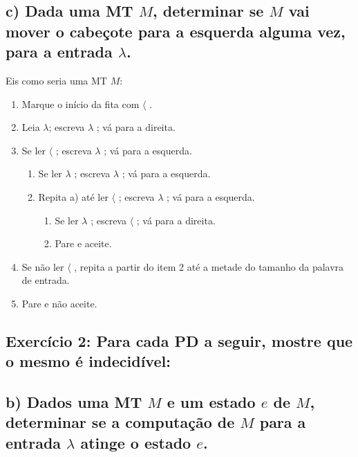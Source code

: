 \subsection*{c) Dada uma MT $M$, determinar se $M$ vai mover o cabeçote para a esquerda alguma vez, para a entrada $\lambda$.}

Eis como seria uma MT $M$:

\begin{enumerate}
    \item Marque o início da fita com $\langle$  .
    \item Leia $\lambda$; escreva $\lambda$ ; vá para a direita.
    \item Se ler $\langle$  ; escreva $\lambda$  ; vá para a esquerda.
        \begin{enumerate}
            \item Se ler $\lambda$  ; escreva $\lambda$  ; vá para a esquerda.
            \item Repita a) até ler $\langle$  ; escreva $\lambda$  ; vá para a esquerda.
            \begin{enumerate}
                \item Se ler $\lambda$  ; escreva $\langle$  ; vá para a direita.
                \item Pare e aceite.
            \end{enumerate}
        \end{enumerate}
    \item Se não ler $\langle$ , repita a partir do item 2 até a metade do tamanho da palavra de entrada.
    \item Pare e não aceite.
\end{enumerate}




\subsection*{Exercício 2: Para cada PD a seguir, mostre que o mesmo é indecidível:}

\subsection*{b) Dados uma MT $M$ e um estado $e$ de $M$, determinar se a computação de $M$ para a entrada $\lambda$ atinge o estado $e$.}

